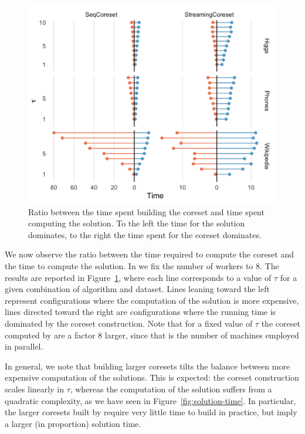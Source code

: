 \begin{figure}
    \includegraphics[width=\columnwidth]{time-ratio.png}
    \caption{
        \label{fig:time-ratio}
        Ratio between the time spent building the coreset and time spent computing the solution.
        To the left the time for the solution dominates, to the right the time spent for the
        coreset dominates.
    }
\end{figure}
We now observe the ratio between the time required to compute the coreset and the time to compute the 
solution.
In \mapr we fix the number of workers to 8.
The results are reported in Figure~\ref{fig:time-ratio}, where each line corresponds to a value of $\tau$
for a given combination of algorithm and dataset.
Lines leaning toward the left represent configurations where the computation of the solution is more expensive,
lines directed toward the right are configurations where the running time is dominated by the coreset construction.
Note that for a fixed value of $\tau$ the coreset computed by \mapr are a factor 8 larger, since that is the number
of machines employed in parallel.

In general, we note that building larger coresets tilts the balance between more expensive 
computation of the solutions. This is expected: the coreset construction scales linearly in $\tau$,
whereas the computation of the solution suffers from a quadratic complexity, as we have 
seen in Figure~\ref{fig:solution-time}.
In particular, the larger coresets built by \mapr require very little time to build in practice,
but imply a larger (in proportion) solution time.

